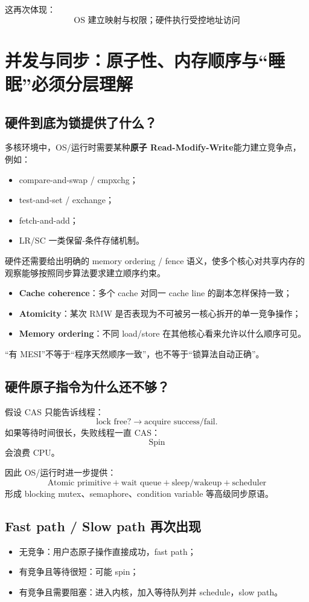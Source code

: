 \documentclass[11pt,a4paper]{ctexart}
\newcommand{\kw}[1]{\textbf{#1}}
\begin{document}
这再次体现：
\[
\boxed{\text{OS 建立映射与权限；硬件执行受控地址访问}}
\]

\section{并发与同步：原子性、内存顺序与“睡眠”必须分层理解}

\subsection{硬件到底为锁提供了什么？}
多核环境中，OS/运行时需要某种\kw{原子 Read-Modify-Write}能力建立竞争点，例如：
\begin{itemize}
  \item compare-and-swap / cmpxchg；
  \item test-and-set / exchange；
  \item fetch-and-add；
  \item LR/SC 一类保留-条件存储机制。
\end{itemize}

硬件还需要给出明确的 memory ordering / fence 语义，使多个核心对共享内存的观察能够按照同步算法要求建立顺序约束。

\begin{bridge}[三个概念不要揉成一个]
\begin{itemize}
  \item \kw{Cache coherence}：多个 cache 对同一 cache line 的副本怎样保持一致；
  \item \kw{Atomicity}：某次 RMW 是否表现为不可被另一核心拆开的单一竞争操作；
  \item \kw{Memory ordering}：不同 load/store 在其他核心看来允许以什么顺序可见。
\end{itemize}
“有 MESI”不等于“程序天然顺序一致”，也不等于“锁算法自动正确”。
\end{bridge}

\subsection{硬件原子指令为什么还不够？}
假设 CAS 只能告诉线程：
\[
\text{lock free?}\rightarrow\text{acquire success/fail}.
\]
如果等待时间很长，失败线程一直 CAS：
\[
\boxed{\text{Spin}}
\]
会浪费 CPU。

因此 OS/运行时进一步提供：
\[
\boxed{
\text{Atomic primitive}
+
\text{wait queue}
+
\text{sleep/wakeup}
+
\text{scheduler}
}
\]
形成 blocking mutex、semaphore、condition variable 等高级同步原语。

\subsection{Fast path / Slow path 再次出现}
\begin{itemize}
  \item 无竞争：用户态原子操作直接成功，fast path；
  \item 有竞争且等待很短：可能 spin；
  \item 有竞争且需要阻塞：进入内核，加入等待队列并 schedule，slow path。
\end{itemize}
\end{document}
